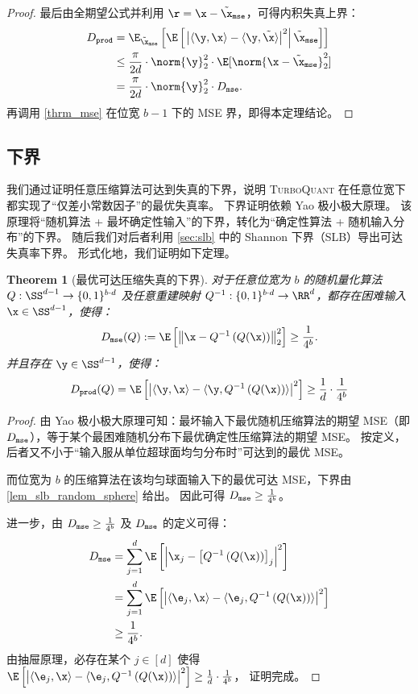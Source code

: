 \documentclass[11pt]{ctexart}
\newtheorem{theorem}{Theorem}
\newcommand{\TurboQuant}{\textsc{TurboQuant}\xspace}
\let\cref\ref
\begin{document}
\begin{proof}
最后由全期望公式并利用 $\r = \x - \tilde{\x}_{\tt mse}$，可得内积失真上界：
\begin{align*}
    D_{\tt prod} &= \E_{\tilde{\x}_{\tt mse}} \left[ \E\left[\left. \left| \langle \y, \x \rangle - \langle \y, \tilde{\x} \rangle \right|^2 \right| \tilde{\x}_{\tt mse} \right] \right]\\
    &\le \frac{\pi}{2 d} \cdot \norm{\y}_2^2 \cdot \E[\norm{\x - \tilde{\x}_{\tt mse}}_2^2]\\
    &= \frac{\pi}{2 d} \cdot \norm{\y}_2^2 \cdot D_{\tt mse}.
\end{align*}
再调用 \cref{thrm_mse} 在位宽 $b-1$ 下的 MSE 界，即得本定理结论。
\end{proof}

\subsection{下界}
\label{sec:lower_bound}

我们通过证明任意压缩算法可达到失真的下界，说明 \TurboQuant 在任意位宽下都实现了“仅差小常数因子”的最优失真率。
下界证明依赖 Yao 极小极大原理。
该原理将“随机算法 + 最坏确定性输入”的下界，转化为“确定性算法 + 随机输入分布”的下界。
随后我们对后者利用 \cref{sec:slb} 中的 Shannon 下界（SLB）导出可达失真率下界。
形式化地，我们证明如下定理。

\begin{theorem}[最优可达压缩失真的下界]
\label{thrm_lower_bound}
对于任意位宽为 $b$ 的随机量化算法 $Q: \SS^{d-1} \to \{ 0, 1 \}^{b \cdot d}$ 及任意重建映射 $Q^{-1}: \{ 0, 1 \}^{b \cdot d} \to \RR^d$，都存在困难输入 $\x \in \SS^{d-1}$，使得：
\[
D_{\tt mse}(Q) := \E\left[\left\| \x - Q^{-1}\left( Q(\x) \right) \right\|_2^2 \right] \ge \frac{1}{4^{b}}.
\]
并且存在 $\y \in \SS^{d-1}$，使得：
\[
D_{\tt prod}(Q) = \E\left[\left| \langle \y, \x \rangle - \langle \y, Q^{-1}\left( Q(\x) \right) \rangle \right|^2 \right] \ge \frac{1}{d} \cdot \frac{1}{4^{b}}
\]
\end{theorem}
\begin{proof}
由 Yao 极小极大原理可知：最坏输入下最优随机压缩算法的期望 MSE（即 $D_{\tt mse}$），等于某个最困难随机分布下最优确定性压缩算法的期望 MSE。
按定义，后者又不小于“输入服从单位超球面均匀分布时”可达到的最优 MSE。

而位宽为 $b$ 的压缩算法在该均匀球面输入下的最优可达 MSE，下界由 \cref{lem_slb_random_sphere} 给出。
因此可得 $D_{\tt mse} \ge \frac{1}{4^b}$。

进一步，由 $D_{\tt mse} \ge \frac{1}{4^b}$ 及 $D_{\tt mse}$ 的定义可得：
\begin{align*}
    D_{\tt mse} &= \sum_{j=1}^d \E \left[\left| \x_j - \left[ Q^{-1}\left( Q(\x) \right) \right]_j \right|^2 \right]\\
    &= \sum_{j=1}^d \E \left[\left| \langle \e_j, \x \rangle - \langle \e_j, Q^{-1}\left( Q(\x) \right) \rangle \right|^2 \right]\\
    &\ge \frac{1}{4^b}.
\end{align*}
由抽屉原理，必存在某个 $j \in [d]$ 使得
$\E \left[\left| \langle \e_j, \x \rangle - \langle \e_j, Q^{-1}\left( Q(\x) \right) \rangle \right|^2 \right] \ge \frac{1}{d} \cdot \frac{1}{4^b}$，
证明完成。
\end{proof}
\end{document}
